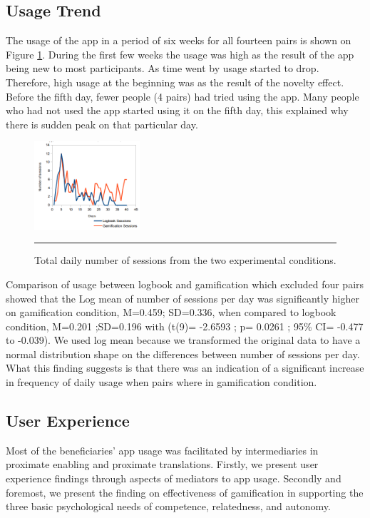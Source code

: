 \documentclass{sig-alternate}
\begin{document}
\subsection{Usage Trend} 
The usage of the app in a period of six weeks for all fourteen pairs is shown on Figure \ref{figure:usagedailysessions}. During the first few weeks the usage was high as the result of the app being new to most participants. As time went by usage started to drop. Therefore, high usage at the beginning was as the result of the novelty effect.  Before the fifth day, fewer people (4 pairs) had tried using the app. Many people who had not used the app started using it on the fifth day, this explained why there is sudden peak on that particular day.
\begin{figure}[htbp]
  \centering
    \includegraphics[width=0.35\textwidth]{scatter_daily_sessions.png}
    \rule{26em}{0.5pt}
  \caption{Total daily number of sessions from the two experimental conditions.}
  \label{figure:usagedailysessions}
\end{figure} 
Comparison of usage between logbook and gamification which excluded four pairs showed that the Log mean of number of sessions per day was significantly higher on gamification condition, M=0.459; SD=0.336, when compared to logbook condition, M=0.201 ;SD=0.196 with (t(9)= -2.6593 ; p= 0.0261 ; 95\% CI=  -0.477 to -0.039). We used log mean because we transformed the original data to have a normal distribution shape on the differences between number of sessions per day. What this finding suggests is that there was an indication of a significant increase in frequency of daily usage when pairs where in gamification condition.
\subsection{User Experience}
Most of the beneficiaries' app usage was facilitated by intermediaries  in proximate enabling and proximate translations\cite{sambasivan2010}. Firstly, we present user experience findings through aspects of  mediators to app usage. Secondly and foremost, we present the finding on effectiveness of gamification in supporting the three basic psychological needs of competence, relatedness, and autonomy.
\end{document}
